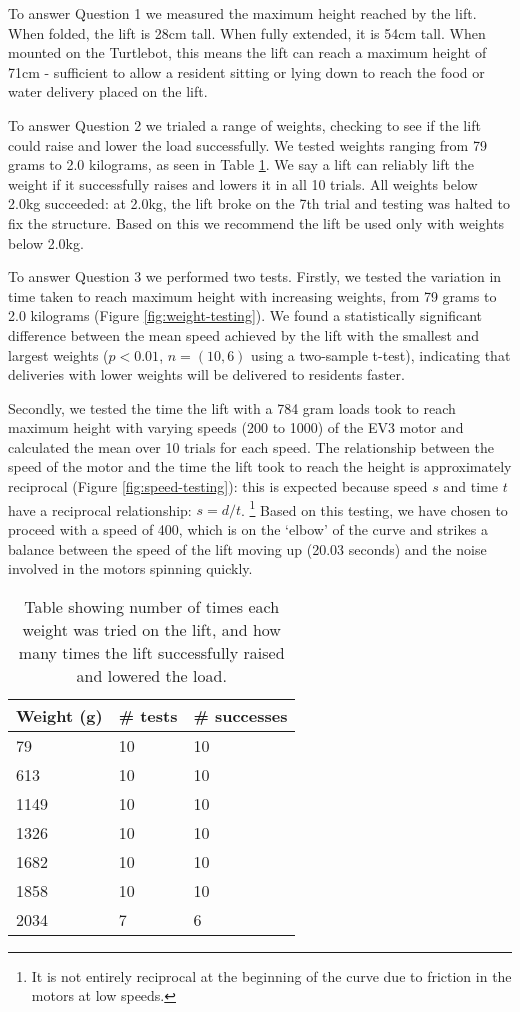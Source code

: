 \documentclass{article}
\begin{document}
To answer Question 1 we measured the maximum height reached by the lift. When folded, the lift is 28cm tall. When fully extended, it is 54cm tall. When mounted on the Turtlebot, this means the lift can reach a maximum height of 71cm - sufficient to allow a resident sitting or lying down to reach the food or water delivery placed on the lift.

To answer Question 2 we trialed a range of weights, checking to see if the lift could raise and lower the load successfully. We tested weights ranging from 79 grams to 2.0 kilograms, as seen in Table \ref{tab:weight}. We say a lift can reliably lift the weight if it successfully raises and lowers it in all 10 trials. All weights below 2.0kg succeeded: at 2.0kg, the lift broke on the 7th trial and testing was halted to fix the structure. Based on this we recommend the lift be used only with weights below 2.0kg.

To answer Question 3 we performed two tests. Firstly, we tested the variation in time taken to reach maximum height with increasing weights, from 79 grams to 2.0 kilograms (Figure \ref{fig:weight-testing}). We found a statistically significant difference between the mean speed achieved by the lift with the smallest and largest weights ($p < 0.01$, $n = (10, 6)$ using a two-sample t-test), indicating that deliveries with lower weights will be delivered to residents faster. 

Secondly, we tested the time the lift with a 784 gram loads took to reach maximum height with varying speeds (200 to 1000) of the EV3 motor and calculated the mean over 10 trials for each speed. The relationship between the speed of the motor and the time the lift took to reach the height is approximately reciprocal (Figure \ref{fig:speed-testing}): this is expected because speed $s$ and time $t$ have a reciprocal relationship: $s = d / t$. \footnote{It is not entirely reciprocal at the beginning of the curve due to friction in the motors at low speeds.} Based on this testing, we have chosen to proceed with a speed of 400, which is on the `elbow' of the curve and strikes a balance between the speed of the lift moving up (20.03 seconds) and the noise involved in the motors spinning quickly.

\begin{table}
  \begin{center}
    \begin{tabular}{lll}
      {\bf Weight (g)} & {\bf \# tests} & {\bf \# successes} \\
      \hline
      79 &   10 & 10 \\
      613 &  10 & 10 \\
      1149 & 10 & 10 \\
      1326 & 10 & 10 \\
      1682 & 10 & 10 \\
      1858 & 10 & 10 \\
      2034 & 7 & 6
    \end{tabular}
    \caption{Table showing number of times each weight was tried on the lift, and how many times the lift successfully raised and lowered the load. }
    \label{tab:weight}
  \end{center}
\end{table}
\end{document}

